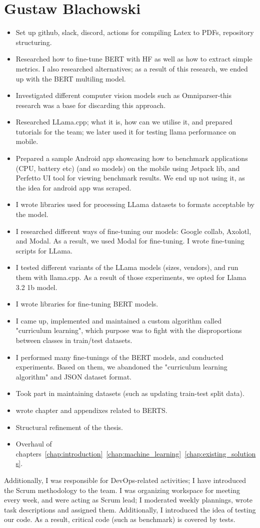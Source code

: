 \documentclass[licencjacka,en]{pracamgr}
\begin{document}
\section{Gustaw Blachowski}
\begin{itemize}
    \item Set up github, slack, discord, actions for compiling Latex to PDFs, repository structuring.
    \item Researched how to fine-tune BERT with HF as well as how to extract simple metrics. I also researched alternatives; as a result of this research,
	we ended up with the BERT multiling model.
    \item Investigated different computer vision models such as Omniparser-this research was a base for discarding this approach.
    \item Researched LLama.cpp; what it is, how can we utilise it, and prepared tutorials for the team; we later used it for testing llama performance on mobile.
    \item Prepared a sample Android app showcasing how to benchmark applications (CPU, battery etc) (and so models) on the mobile using Jetpack lib,
	and Perfetto UI tool for viewing benchmark results. We end up not using it, as the idea for android app was scraped.
    \item I wrote libraries used for processing LLama datasets to formats acceptable by the model.
    \item I researched different ways of fine-tuning our models: Google collab, Axolotl, and Modal. As a result,
	we used Modal for fine-tuning. I wrote fine-tuning scripts for LLama.
    \item I tested different variants of the LLama models (sizes, vendors), and run them with llama.cpp.
	As a result of those experiments, we opted for Llama 3.2 1b model.
    \item I wrote libraries for fine-tuning BERT models.
    \item I came up, implemented and maintained a custom algorithm called "curriculum learning", which purpose was to fight with the disproportions
	between classes in train/test datasets.
    \item I performed many fine-tunings of the BERT models, and conducted experiments. Based on them, we abandoned the "curriculum learning algorithm" and JSON dataset format.
    \item Took part in maintaining datasets (such as updating train-test split data).
    \item  wrote chapter and appendixes related to BERTS.
    \item Structural refinement of the thesis.
    \item Overhaul of chapters~\ref{chap:introduction}~\ref{chap:machine_learning}~\ref{chap:existing_solutions}.
\end{itemize}
Additionally, I was responsible for DevOps-related activities; I have introduced the Scrum methodology to the team. I was organizing workspace for meeting every week, and were acting as Scrum lead; I moderated weekly plannings,
wrote task descriptions and assigned them. Additionally, I introduced the idea of testing our code. As a result, critical code (such as benchmark) is covered by tests.
\end{document}
